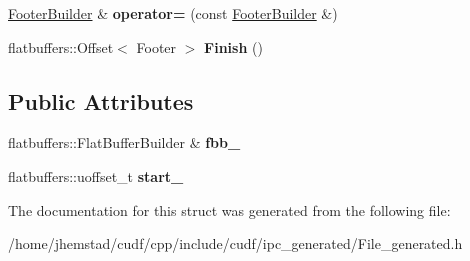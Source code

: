 \begin{DoxyCompactItemize}
\item 
\hyperlink{structorg_1_1apache_1_1arrow_1_1flatbuf_1_1FooterBuilder}{Footer\+Builder} \& {\bfseries operator=} (const \hyperlink{structorg_1_1apache_1_1arrow_1_1flatbuf_1_1FooterBuilder}{Footer\+Builder} \&)\hypertarget{structorg_1_1apache_1_1arrow_1_1flatbuf_1_1FooterBuilder_ad5ddde31088a1e8b6469c959101ee857}{}\label{structorg_1_1apache_1_1arrow_1_1flatbuf_1_1FooterBuilder_ad5ddde31088a1e8b6469c959101ee857}

\item 
flatbuffers\+::\+Offset$<$ Footer $>$ {\bfseries Finish} ()\hypertarget{structorg_1_1apache_1_1arrow_1_1flatbuf_1_1FooterBuilder_ac41cd7f971671f1b5fccef9195a2227f}{}\label{structorg_1_1apache_1_1arrow_1_1flatbuf_1_1FooterBuilder_ac41cd7f971671f1b5fccef9195a2227f}

\end{DoxyCompactItemize}
\subsection*{Public Attributes}
\begin{DoxyCompactItemize}
\item 
flatbuffers\+::\+Flat\+Buffer\+Builder \& {\bfseries fbb\+\_\+}\hypertarget{structorg_1_1apache_1_1arrow_1_1flatbuf_1_1FooterBuilder_ad83bebb23a28699ab4996982020d3353}{}\label{structorg_1_1apache_1_1arrow_1_1flatbuf_1_1FooterBuilder_ad83bebb23a28699ab4996982020d3353}

\item 
flatbuffers\+::uoffset\+\_\+t {\bfseries start\+\_\+}\hypertarget{structorg_1_1apache_1_1arrow_1_1flatbuf_1_1FooterBuilder_a48c6243625134e229fede6aacd6a00ea}{}\label{structorg_1_1apache_1_1arrow_1_1flatbuf_1_1FooterBuilder_a48c6243625134e229fede6aacd6a00ea}

\end{DoxyCompactItemize}


The documentation for this struct was generated from the following file\+:\begin{DoxyCompactItemize}
\item 
/home/jhemstad/cudf/cpp/include/cudf/ipc\+\_\+generated/File\+\_\+generated.\+h\end{DoxyCompactItemize}
